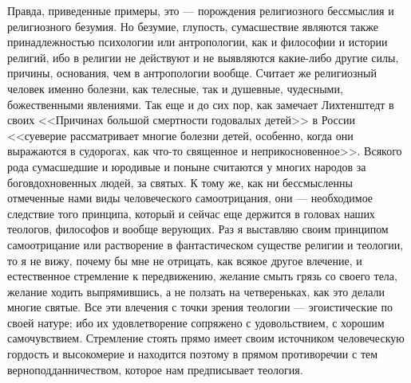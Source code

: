 \documentclass[12pt]{article}
\begin{document}
Правда, приведенные примеры, это --- порождения религиозного бессмыслия и религиозного безумия. Но безумие, глупость, сумасшествие являются также принадлежностью психологии или антропологии, как и философии и истории религий, ибо в религии не действуют и не выявляются какие-либо другие силы, причины, основания, чем в антропологии вообще. Считает же религиозный человек именно болезни, как телесные, так и душевные, чудесными, божественными явлениями. Так еще и до сих пор, как замечает Лихтенштедт в своих <<Причинах большой смертности годовалых детей>> в России <<суеверие рассматривает многие болезни детей, особенно, когда они выражаются в судорогах, как что-то священное и неприкосновенное>>. Всякого рода сумасшедшие и юродивые и поныне считаются у многих народов за боговдохновенных людей, за святых. К тому же, как ни бессмысленны отмеченные нами виды человеческого самоотрицания, они --- необходимое следствие того принципа, который и сейчас еще держится в головах наших теологов, философов и вообще верующих. Раз я выставляю своим принципом самоотрицание или растворение в фантастическом существе религии и теологии, то я не вижу, почему бы мне не отрицать, как всякое другое влечение, и естественное стремление к передвижению, желание смыть грязь со своего тела, желание ходить выпрямившись, а не ползать на четвереньках, как это делали многие святые. Все эти влечения с точки зрения теологии --- эгоистические по своей натуре; ибо их удовлетворение сопряжено с удовольствием, с хорошим самочувствием. Стремление стоять прямо имеет своим источником человеческую гордость и высокомерие и находится поэтому в прямом противоречии с тем верноподданничеством, которое нам предписывает теология. 
\end{document}
